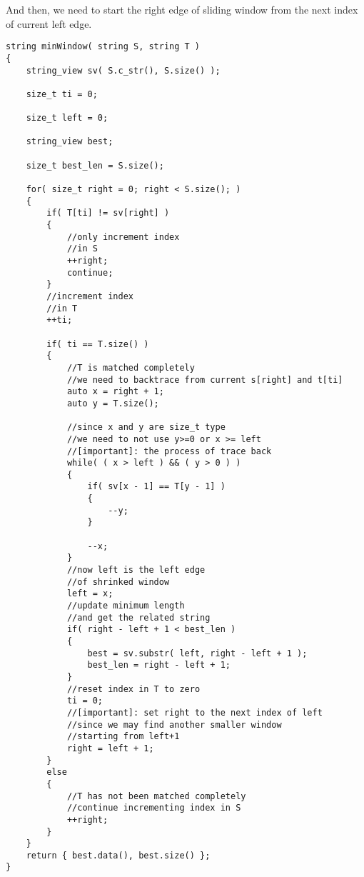 And then, we need to start the right edge of sliding window from the next index of current left edge.

\setcounter{lstlisting}{0}
\begin{lstlisting}[style=customc, caption={Sliding Window}]
string minWindow( string S, string T )
{
    string_view sv( S.c_str(), S.size() );

    size_t ti = 0;

    size_t left = 0;

    string_view best;

    size_t best_len = S.size();

    for( size_t right = 0; right < S.size(); )
    {
        if( T[ti] != sv[right] )
        {
            //only increment index
            //in S
            ++right;
            continue;
        }
        //increment index
        //in T
        ++ti;

        if( ti == T.size() )
        {
            //T is matched completely
            //we need to backtrace from current s[right] and t[ti]
            auto x = right + 1;
            auto y = T.size();

            //since x and y are size_t type
            //we need to not use y>=0 or x >= left
            //[important]: the process of trace back
            while( ( x > left ) && ( y > 0 ) )
            {
                if( sv[x - 1] == T[y - 1] )
                {
                    --y;
                }

                --x;
            }
            //now left is the left edge
            //of shrinked window
            left = x;
            //update minimum length
            //and get the related string
            if( right - left + 1 < best_len )
            {
                best = sv.substr( left, right - left + 1 );
                best_len = right - left + 1;
            }
            //reset index in T to zero
            ti = 0;
            //[important]: set right to the next index of left
            //since we may find another smaller window
            //starting from left+1
            right = left + 1;
        }
        else
        {
            //T has not been matched completely
            //continue incrementing index in S
            ++right;
        }
    }
    return { best.data(), best.size() };
}
\end{lstlisting}